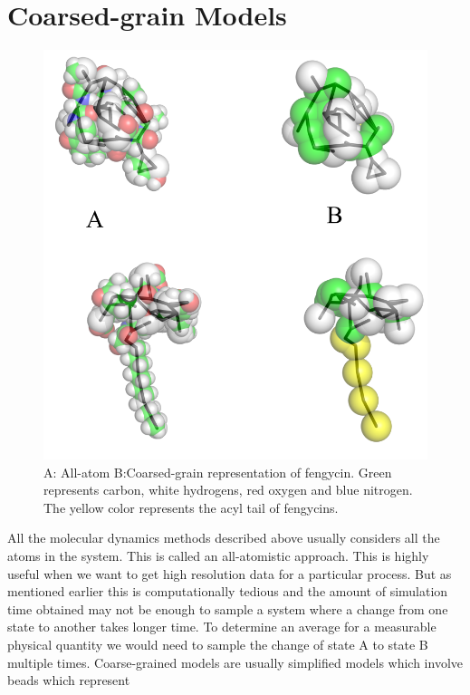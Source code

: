 \section{Coarsed-grain Models}
\begin{figure}
    \centering
    \includegraphics[width=1.0\textwidth]{chapter1_figs/structures.png}
    \caption{A: All-atom  B:Coarsed-grain representation of fengycin. Green represents carbon, white hydrogens, red oxygen and blue nitrogen. The yellow color represents the acyl tail of fengycins. \cite{Grossfield2013}}
    \label{fig:cg_feng}
\end{figure}
All the molecular dynamics methods described above usually considers all the atoms in the system.
This is called an all-atomistic approach. This is highly useful when we want to get
high resolution data for a particular process.
But as mentioned earlier this is computationally tedious and
the amount of simulation time obtained may not be enough to
sample a system where a change from one state to another 
takes longer time. To determine an average for a measurable physical quantity
we would need to sample the change of state A to state B multiple 
times.
Coarse-grained models are usually simplified models which involve beads which represent 
